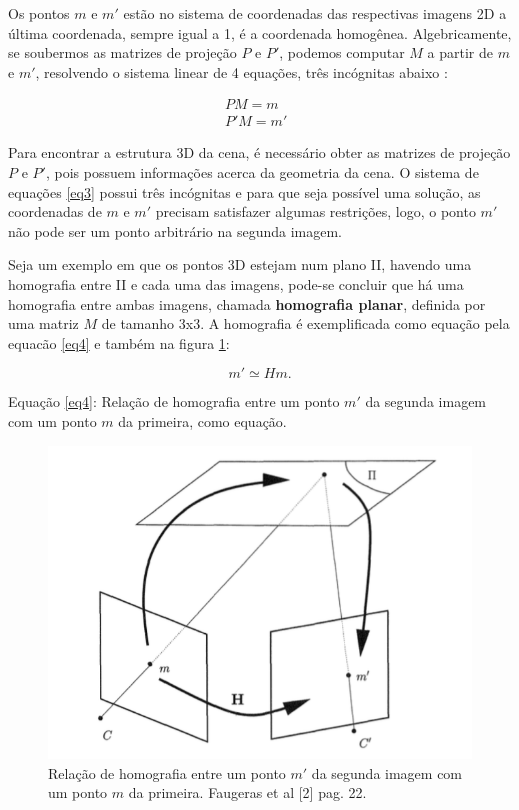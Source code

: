 Os pontos $m$ e $m'$ estão no sistema de coordenadas das respectivas imagens 2D a última coordenada, sempre igual a 1, é a coordenada homogênea.
Algebricamente, se soubermos as matrizes de projeção $P$ e $P'$, podemos computar $M$ a partir de $m$ e $m'$, resolvendo o sistema linear de 4 equações, três incógnitas abaixo \cite{Faugeras-Geometry}:

\begin{equation}\label{eq3}
\begin{aligned}
	PM = m \\
	P'M = m'
\end{aligned} \; \;
\end{equation}

Para encontrar a estrutura 3D da cena, é necessário obter as matrizes de projeção $P$ e $P'$, pois possuem informações acerca da geometria da cena. O sistema de equações \eqref{eq3} possui três incógnitas e para que seja possível uma solução, as coordenadas de $m$ e $m'$ precisam satisfazer algumas restrições, logo, o ponto $m'$ não pode ser um ponto arbitrário na segunda imagem.

Seja um exemplo em que os pontos 3D estejam num plano II, havendo uma homografia \cite{Faugeras-Geometry} entre II e cada uma das imagens, pode-se concluir que há uma homografia entre ambas imagens, chamada \textbf{homografia planar}, definida por uma matriz $M$ de tamanho 3x3. A homografia é exemplificada como equação pela equacão \eqref{eq4} e também na figura \ref{fig1}:

\begin{equation}\label{eq4}
m' \simeq Hm.
\end{equation}

Equação \eqref{eq4}: Relação de homografia entre um ponto $m'$ da segunda imagem com um ponto $m$ da primeira, como equação.

\begin{figure}[H]
	\centering
		\includegraphics{Imagens/figura2-1.png}
	\caption{Relação de homografia entre um ponto $m'$ da segunda imagem com um ponto $m$ da primeira. Faugeras et al [2] pag. 22.}
	\label{fig1}
\end{figure}

